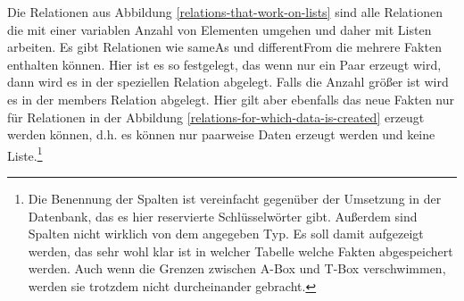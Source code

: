 Die Relationen aus Abbildung \ref{relations-that-work-on-lists} sind alle Relationen die mit einer variablen Anzahl von Elementen umgehen und daher mit Listen arbeiten. Es gibt Relationen wie sameAs und differentFrom die mehrere Fakten enthalten können. Hier ist es so festgelegt, das wenn nur ein Paar erzeugt wird, dann wird es in der speziellen Relation abgelegt. Falls die Anzahl größer ist wird es in der members Relation abgelegt. Hier gilt aber ebenfalls das neue Fakten nur für Relationen in der Abbildung \ref{relations-for-which-data-is-created} erzeugt werden können, d.h. es können nur paarweise Daten erzeugt werden und keine Liste.\footnote{Die Benennung der Spalten ist vereinfacht gegenüber der Umsetzung in der Datenbank, das es hier reservierte Schlüsselwörter gibt. Außerdem sind Spalten nicht wirklich von dem angegeben Typ. Es soll damit aufgezeigt werden, das sehr wohl klar ist in welcher Tabelle welche Fakten abgespeichert werden. Auch wenn die Grenzen zwischen A-Box und T-Box verschwimmen, werden sie trotzdem nicht durcheinander gebracht.}

